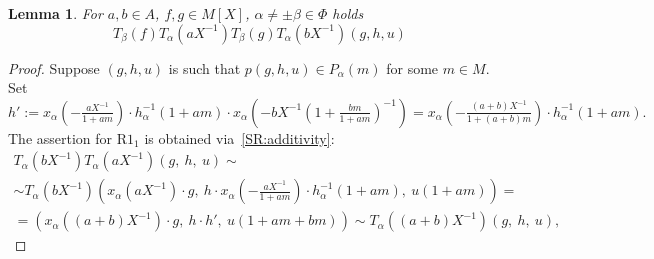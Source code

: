 \documentclass[oneside, 8pt]{amsart}
\newtheorem{lemma}{Lemma}
\theoremstyle{remark}
\theoremstyle{definition}
\numberwithin{equation}{section}
\begin{document}
\begin{lemma}
 For $a, b\in A$, $f, g \in M[X]$, $\alpha \neq \pm \beta \in \Phi$ holds
 \[ T_\beta(f) T_\alpha(aX^{-1})  T_\beta(g) T_\alpha(bX^{-1})(g, h, u) \]
\end{lemma}
\begin{proof}
Suppose $(g, h, u)$ is such that $p(g, h, u) \in P_\alpha(m)$ for some $m \in M$.
Set $h' := x_\alpha\left(-\tfrac{aX^{-1}}{1+am}\right) \cdot h^{-1}_\alpha(1+am) \cdot x_\alpha\left(-bX^{-1}\left(1 + \tfrac{bm}{1+am}\right)^{-1}\right) =
  x_\alpha\left(- \tfrac{(a+b)X^{-1}}{1 + (a + b)m}\right) \cdot h^{-1}_\alpha(1+am).$
The assertion for $\text{R1}_1$ is obtained via~\cref{SR:additivity}:
\begin{multline} \nonumber T_\alpha(bX^{-1}) T_\alpha(aX^{-1}) \left(g,\ h,\ u\right) \sim \\ \sim
T_\alpha(bX^{-1}) \left(x_\alpha(aX^{-1})\cdot g,\ h \cdot x_\alpha\left(-\tfrac{aX^{-1}}{1 + am}\right) \cdot h^{-1}_\alpha(1 + am),\ u(1 + am)\right) = \\
 = \left( x_\alpha\left((a+b)X^{-1}\right)\cdot g,\ h \cdot h',\ u(1 + am + bm) \right) \sim T_\alpha((a+b)X^{-1}) \left( g,\ h,\ u\right), \end{multline} 
 
\end{proof}
\end{document}
